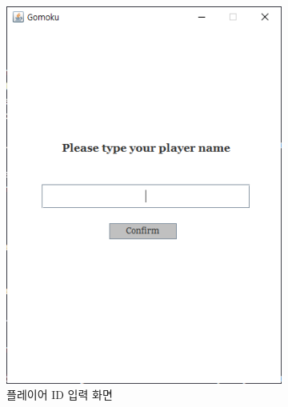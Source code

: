 \documentclass[a4paper, 10pt]{article}
\begin{document}
\begin{figure}[h]
  \centering
  \begin{subfigure}{.3\textwidth}
    \centering
    \includegraphics[width=.9\linewidth]{resource/login}
    \caption{플레이어 ID 입력 화면}
    \label{fig:login}
  \end{subfigure}
  \begin{subfigure}{.3\textwidth}
    \centering

\end{subfigure}
\end{figure}
\end{document}
